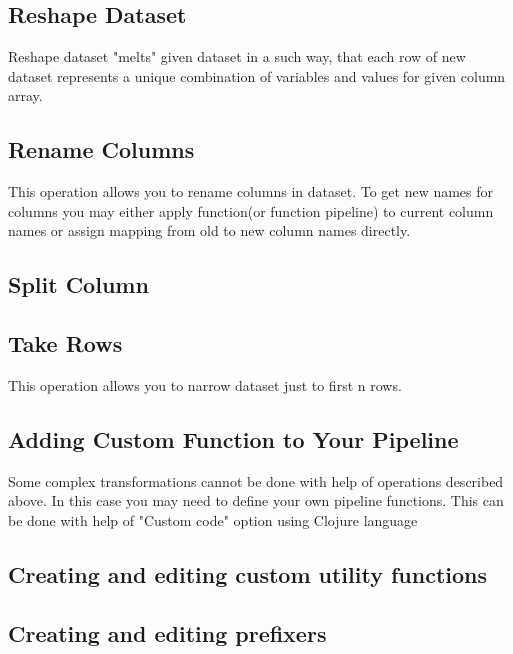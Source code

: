 \documentclass[USenglish]{article}
\begin{document}
\subsection{Reshape Dataset}
Reshape dataset "melts" given dataset in a such way, that each row of new dataset represents a unique combination of variables and values for given column array.
\subsection{Rename Columns}
This operation allows you to rename columns in dataset. To get new names for columns you may either apply function(or function pipeline) to current column names or assign mapping from old to new column names directly.
\subsection{Split Column}
\subsection{Take Rows}
This operation allows you to narrow dataset just to first n rows.
\subsection{Adding Custom Function to Your Pipeline \label{customfunction}}

Some complex transformations cannot be done with help of operations described above. In this case you may need to define your own pipeline functions. This can be done with help of "Custom code" option using Clojure language
\subsection{Creating and editing custom utility functions \label{customFunc}}
\subsection{Creating and editing prefixers \label{customFunc}}
\end{document}
